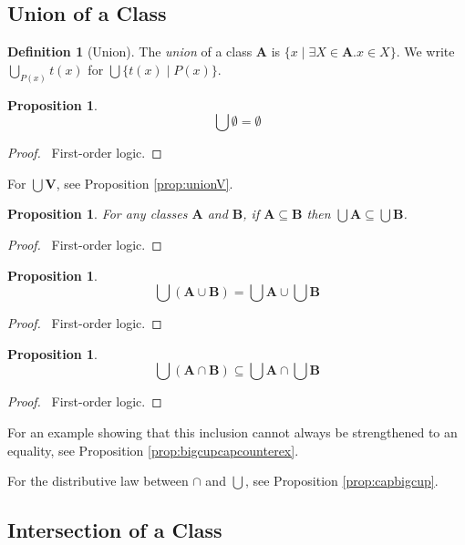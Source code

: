 \documentclass{book}
\let\qed\relax
\newtheorem{prop}[ax]{Proposition}
\theoremstyle{definition}
\newtheorem{df}[ax]{Definition}
\begin{document}
\subsection{Union of a Class}

\begin{df}[Union]
The \emph{union} of a class $\mathbf{A}$ is $\{ x \mid \exists X \in \mathbf{A}. x \in X\}$.
We write $\bigcup_{P(x)} t(x)$ for $\bigcup \{ t(x) \mid P(x) \}$.
\end{df}

\begin{prop}
\[ \bigcup \emptyset = \emptyset \]
\end{prop}

\begin{proof}
\pf\ First-order logic. \qed
\end{proof}

For $\bigcup \mathbf{V}$, see Proposition \ref{prop:unionV}.

\begin{prop}
For any classes $\mathbf{A}$ and $\mathbf{B}$, if $\mathbf{A} \subseteq \mathbf{B}$ then $\bigcup \mathbf{A} \subseteq \bigcup \mathbf{B}$.
\end{prop}

\begin{proof}
\pf\ First-order logic. \qed
\end{proof}

\begin{prop}
\[ \bigcup (\mathbf{A} \cup \mathbf{B}) = \bigcup \mathbf{A} \cup \bigcup \mathbf{B} \]
\end{prop}

\begin{proof}
\pf\ First-order logic. \qed
\end{proof}

\begin{prop}
\[ \bigcup (\mathbf{A} \cap \mathbf{B}) \subseteq \bigcup \mathbf{A} \cap \bigcup \mathbf{B} \]
\end{prop}

\begin{proof}
\pf\ First-order logic. \qed
\end{proof}

For an example showing that this inclusion cannot always be strengthened to an equality, see Proposition \ref{prop:bigcupcapcounterex}.

For the distributive law between $\cap$ and $\bigcup$, see Proposition \ref{prop:capbigcup}.

\subsection{Intersection of a Class}
\end{document}

